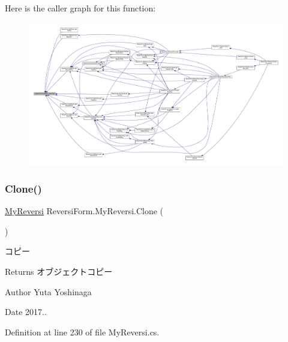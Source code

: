 Here is the caller graph for this function\+:
\nopagebreak
\begin{figure}[H]
\begin{center}
\leavevmode
\includegraphics[width=350pt]{class_reversi_form_1_1_my_reversi_a7d861112d0ddeb404cd3e8d8f5c2756b_icgraph}
\end{center}
\end{figure}
\mbox{\label{class_reversi_form_1_1_my_reversi_aa340f79c0f7bb78750c410ce73ca7b99}} 
\subsubsection{\texorpdfstring{Clone()}{Clone()}}
{\footnotesize\ttfamily \hyperlink{class_reversi_form_1_1_my_reversi}{My\+Reversi} Reversi\+Form.\+My\+Reversi.\+Clone (\begin{DoxyParamCaption}{ }\end{DoxyParamCaption})}



コピー 

\begin{DoxyReturn}{Returns}
オブジェクトコピー 
\end{DoxyReturn}
\begin{DoxyAuthor}{Author}
Yuta Yoshinaga 
\end{DoxyAuthor}
\begin{DoxyDate}{Date}
2017.. 
\end{DoxyDate}


Definition at line 230 of file My\+Reversi.\+cs.

\mbox{\label{class_reversi_form_1_1_my_reversi_aa69640136727deb89addafae8e8e54cb}} 
